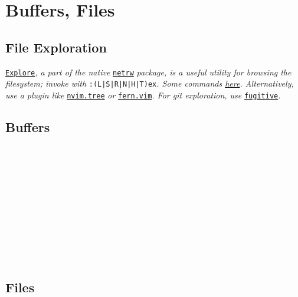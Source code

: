 \section{Buffers, Files}


\subsection*{File Exploration}

\href{https://vonheikemen.github.io/devlog/tools/using-netrw-vim-builtin-file-explorer/}{\texttt{Explore}}\textit{, a part of the native }\href{https://neovim.io/doc/user/pi\_netrw.html}{\texttt{netrw}}\textit{ package, is a useful utility for browsing the filesystem; invoke with }\texttt{:(L|S|R|N|H|T)ex}\textit{. Some commands \href{https://gist.github.com/danidiaz/37a69305e2ed3319bfff9631175c5d0f}{here}. Alternatively, use a plugin like }\href{https://github.com/nvim-tree/nvim-tree.lua}{\texttt{nvim.tree}}\textit{ or }\href{https://github.com/lambdalisue/fern.vim}{\texttt{fern.vim}}\textit{. For git exploration, use }\href{https://github.com/tpope/vim-fugitive}{\texttt{fugitive}}\textit{.}


\subsection*{Buffers}

\\
\\
\\
\\
\\
\\
\\
\\
\\
\\


\subsection*{Files}

